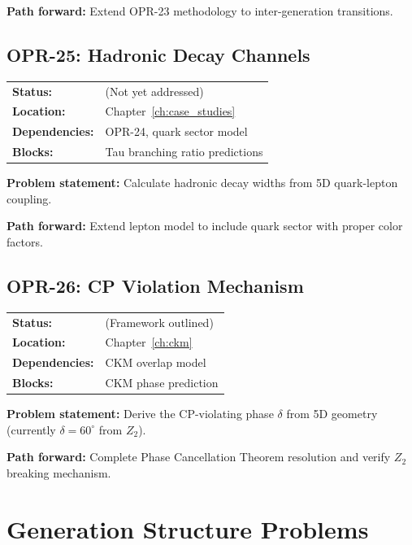 \textbf{Path forward:} Extend OPR-23 methodology to inter-generation transitions.

\bigskip

\subsection*{OPR-25: Hadronic Decay Channels}
\begin{tabular}{ll}
\textbf{Status:} & \tagOpen{} (Not yet addressed) \\
\textbf{Location:} & Chapter~\ref{ch:case_studies} \\
\textbf{Dependencies:} & OPR-24, quark sector model \\
\textbf{Blocks:} & Tau branching ratio predictions \\
\end{tabular}

\textbf{Problem statement:} Calculate hadronic decay widths from 5D
quark-lepton coupling.

\textbf{Path forward:} Extend lepton model to include quark sector
with proper color factors.

\bigskip

\subsection*{OPR-26: CP Violation Mechanism}
\begin{tabular}{ll}
\textbf{Status:} & \tagOpen{} (Framework outlined) \\
\textbf{Location:} & Chapter~\ref{ch:ckm} \\
\textbf{Dependencies:} & CKM overlap model \\
\textbf{Blocks:} & CKM phase prediction \\
\end{tabular}

\textbf{Problem statement:} Derive the CP-violating phase $\delta$
from 5D geometry (currently $\delta = 60^\circ$ from $Z_2$).

\textbf{Path forward:} Complete Phase Cancellation Theorem resolution
and verify $Z_2$ breaking mechanism.

\section{Generation Structure Problems}


